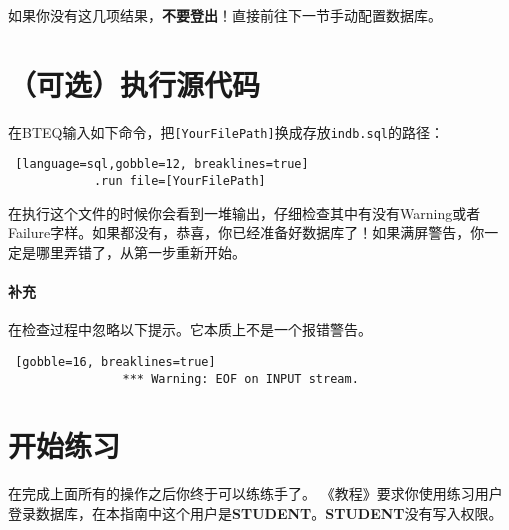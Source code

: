 \documentclass{article}
\begin{document}

		
		如果你没有这几项结果，\textbf{不要登出}！直接前往下一节手动配置数据库。

		

	\section{（可选）执行源代码} %
		
		 \par

		\bigskip
	



		在BTEQ输入如下命令，把\lstinline|[YourFilePath]|换成存放\lstinline|indb.sql|的路径：

		\begin{lstlisting} [language=sql,gobble=12, breaklines=true]
			.run file=[YourFilePath]
		\end{lstlisting}

		在执行这个文件的时候你会看到一堆输出，仔细检查其中有没有Warning或者Failure字样。如果都没有，恭喜，你已经准备好数据库了！如果满屏警告，你一定是哪里弄错了，从第一步重新开始。

		\paragraph{补充}
			在检查过程中忽略以下提示。它本质上不是一个报错警告。

			\begin{lstlisting} [gobble=16, breaklines=true]
				*** Warning: EOF on INPUT stream.
			\end{lstlisting}


	\section{开始练习} %
		在完成上面所有的操作之后你终于可以练练手了。
		 《教程》要求你使用练习用户登录数据库，在本指南中这个用户是\textbf{STUDENT}。\textbf{STUDENT}没有写入权限。
\end{document}
